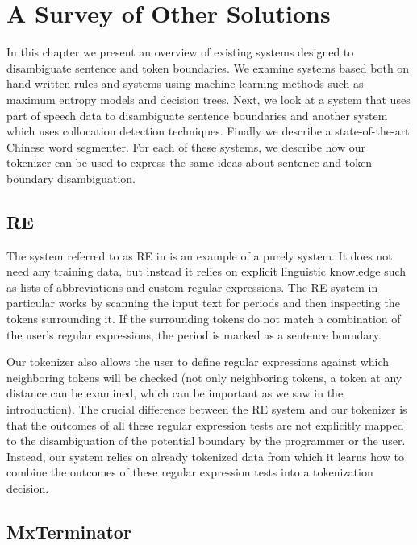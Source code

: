 \section{A Survey of Other Solutions}
\label{chap:survey}

In this chapter we present an overview of existing systems designed to
disambiguate sentence and token boundaries. We examine systems based both on
hand-written rules and systems using machine learning methods such as maximum
entropy models and decision trees. Next, we look at a system that uses part of
speech data to disambiguate sentence boundaries and another system which uses
collocation detection techniques. Finally we describe a state-of-the-art
Chinese word segmenter. For each of these systems, we describe how our
tokenizer can be used to express the same ideas about sentence and token
boundary disambiguation.

\subsection{RE}
\label{sec:survey-re}

The system \cite{sbd-re} referred to as RE in \cite{sbd-punkt} is an example of
a purely  system. It does not need any training data, but
instead it relies on explicit linguistic knowledge such as lists of
abbreviations and custom regular expressions. The RE system in particular works
by scanning the input text for periods and then inspecting the tokens
surrounding it. If the surrounding tokens do not match a combination of the
user's regular expressions, the period is marked as a sentence boundary.

Our tokenizer also allows the user to define regular expressions against which
neighboring tokens will be checked (not only neighboring tokens, a token at any
distance can be examined, which can be important as we saw in the
introduction). The crucial difference between the RE system and our tokenizer
is that the outcomes of all these regular expression tests are not explicitly
mapped to the disambiguation of the potential boundary by the programmer or the
user. Instead, our system relies on already tokenized data from which it learns
how to combine the outcomes of these regular expression tests into a
tokenization decision.

\subsection{MxTerminator}
\label{sec:survey-mxterm}


